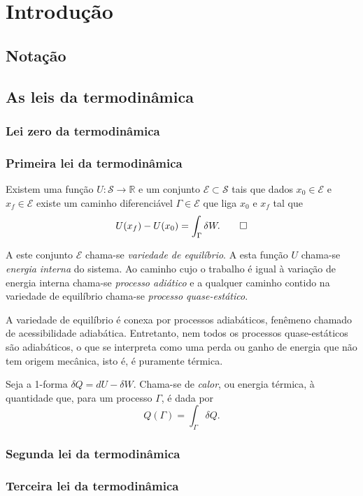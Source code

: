 \chapter{Introdução}

\section{Notação}

\section{As leis da termodinâmica}

\subsection{Lei zero da termodinâmica}
\subsection{Primeira lei da termodinâmica}

\begin{axioma}
   Existem uma função $U:\mathcal{S}\rightarrow\mathbb{R}$
   e um conjunto $\mathcal{E}\subset\mathcal{S}$ tais que
   dados $x_0\in\mathcal{E}$ e $x_f\in\mathcal{E}$
   existe um caminho diferenciável $\Gamma\in\mathcal{E}$
   que liga $x_0$ e $x_f$ tal que
   $$ U(x_f) - U(x_0) = \int_{\Gamma} \delta W. \qedhere $$
\end{axioma}

A este conjunto $\mathcal{E}$ chama-se \textit{variedade de equilíbrio}.
A esta função $U$ chama-se \textit{energia interna} do sistema.
Ao caminho cujo o trabalho é igual à variação de energia interna chama-se
\textit{processo adiático} e a qualquer caminho contido na
variedade de equilíbrio chama-se \textit{processo quase-estático}.

A variedade de equilíbrio é conexa por processos adiabáticos,
fenêmeno chamado de acessibilidade adiabática.
Entretanto, nem todos os processos quase-estáticos são adiabáticos,
o que se interpreta como uma perda ou ganho de energia
que não tem origem mecânica, isto é, é puramente térmica.

\begin{definicao}
   Seja a 1-forma $\delta Q = dU - \delta W$.
   Chama-se de \textit{calor}, ou energia térmica,
   à quantidade que, para um processo $\Gamma$, é dada por
   $$ Q(\Gamma) = \int_{\Gamma} \delta Q. $$
\end{definicao}

\lipsum[2]

\subsection{Segunda lei da termodinâmica}
\subsection{Terceira lei da termodinâmica}
